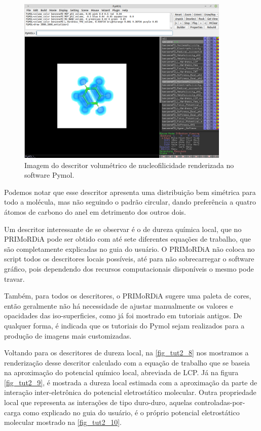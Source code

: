 \documentclass[a4paper,11pt]{refart}
\begin{document}
\hspace*{-\leftmarginwidth}
\begin{minipage}{\fullwidth}
	\begin{figure}[H]
		\begin{center}
			\includegraphics[width=4in]{images/tut2_img8}
			\caption{Imagem do descritor volumétrico de nucleofilicidade renderizada no software Pymol.}
			\label{fig_tut2_7}
		\end{center}
	\end{figure}
\end{minipage}

Podemos notar que esse descritor apresenta uma distribuição bem simétrica para todo a molécula, mas não seguindo o padrão circular, dando preferência a quatro átomos de carbono  do anel em detrimento dos outros dois. 

Um descritor interessante de se observar é o de dureza química local, que no PRIMoRDiA pode ser obtido com até sete diferentes equações de trabalho, que são completamente explicadas no guia do usuário. O PRIMoRDiA não coloca no script todos os descritores locais possíveis, até para não sobrecarregar o software gráfico, pois dependendo dos recursos computacionais disponíveis o mesmo pode travar. 

Também, para todos os descritores, o PRIMoRDiA sugere uma paleta de cores, então geralmente não há necessidade de ajustar manualmente os valores e opacidades das iso-superficies, como já foi mostrado em tutoriais antigos. De qualquer forma, é indicada que os tutoriais do Pymol sejam realizados para a produção de imagens mais customizadas. 

Voltando para os descritores de dureza local, na \autoref{fig_tut2_8} nos mostramos a renderização desse descritor calculado com a equação de trabalho que se baseia na aproximação do potencial químico local, abreviada de LCP. Já na figura \autoref{fig_tut2_9}, é mostrada a dureza local estimada com a aproximação da parte de interação inter-eletrônica do potencial eletrostático molecular. Outra propriedade local que representa as interações de tipo duro-duro, aquelas controladas-por-carga como explicado no guia do usuário, é o próprio potencial eletrostático molecular mostrado na \autoref{fig_tut2_10}. 
\end{document}
